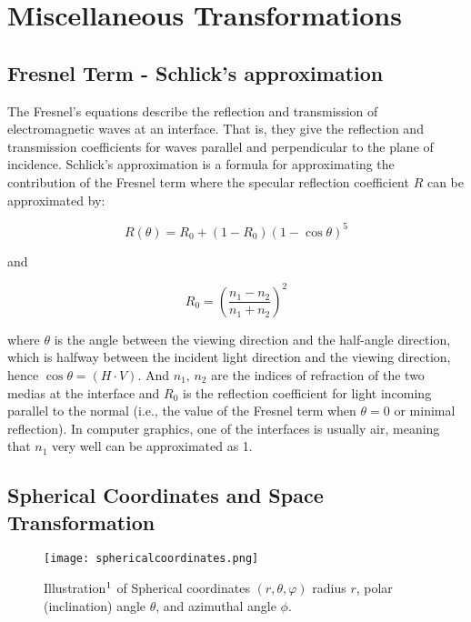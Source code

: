 \chapter{Miscellaneous Transformations}
\section{Fresnel Term - Schlick's approximation}
The Fresnel's equations describe the reflection and transmission of electromagnetic waves at an interface. That is, they give the reflection and transmission coefficients for waves parallel and perpendicular to the plane of incidence. Schlick's approximation is a formula for approximating the contribution of the Fresnel term where the specular reflection coefficient $R$ can be approximated by:

\begin{equation}
 R(\theta) = R_0 + (1 - R_0)(1 - \cos \theta)^5
\label{eq:schlickapprox}
\end{equation}

and

\begin{equation*}
  R_0 = \left(\frac{n_1-n_2}{n_1+n_2}\right)^2
\end{equation*}

where $\theta$ is the angle between the viewing direction and the half-angle direction, which is halfway between the incident 
light direction and the viewing direction, hence $\cos\theta=(H\cdot V)$. And $n_1,\,n_2$ are the indices of refraction of the two medias at the interface and $R_0$ is the reflection coefficient for light incoming parallel to the normal (i.e., the value of the Fresnel term when $\theta = 0$ or minimal reflection). In computer graphics, one of the interfaces is usually air, meaning that $n_1$ very well can be approximated as 1.

\section{Spherical Coordinates and Space Transformation}
\label{sec:sphericalcoordinates}
\begin{figure}[H]
  \centering
  \texttt{[image: sphericalcoordinates.png]}
  \caption[Illustration of Spherical Coordinate System]{Illustration$\footnotemark$ of Spherical coordinates $(r,θ,φ)$ radius $r$, polar (inclination) angle $\theta$, and azimuthal angle $\phi$.}
  \label{fig:sphericalcoordinatesystem}
\end{figure}

